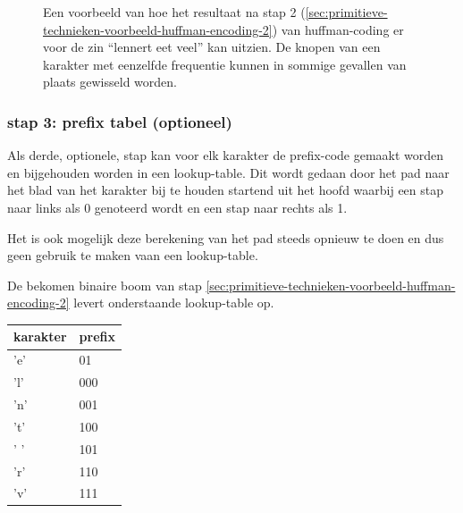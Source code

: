 \FloatBarrier
\begin{figure}[h!]
	\caption{Een voorbeeld van hoe het resultaat na stap 2 (\ref{sec:primitieve-technieken-voorbeeld-huffman-encoding-2}) van \gls{huffman-coding} er voor de zin “lennert eet veel” kan uitzien. De knopen van een karakter met eenzelfde frequentie kunnen in sommige gevallen van plaats gewisseld worden.}
	\label{fig:huffman-stap-2}
\end{figure}
\FloatBarrier

\subsubsection{stap 3: prefix tabel (optioneel)}
\label{sec:primitieve-technieken-voorbeeld-huffman-encoding-3}
Als derde, optionele, stap kan voor elk karakter de \gls{prefix-code} gemaakt worden en bijgehouden worden in een \gls{lookup-table}. Dit wordt gedaan door het pad naar het blad van het karakter bij te houden startend uit het hoofd waarbij een stap naar links als 0 genoteerd wordt en een stap naar rechts als 1.

Het is ook mogelijk deze berekening van het pad steeds opnieuw te doen en dus geen gebruik te maken vaan een \gls{lookup-table}.

De bekomen binaire boom van stap \ref{sec:primitieve-technieken-voorbeeld-huffman-encoding-2} levert onderstaande \gls{lookup-table} op.

\FloatBarrier
\begin{table}[h!]
	\begin{tabular}{|l|l|}
		\hline
		\textbf{karakter} & \textbf{prefix} \\ \hline
		'e'               & 01              \\ \hline
		'l'               & 000             \\ \hline
		'n'               & 001             \\ \hline
		't'               & 100             \\ \hline
		' '               & 101             \\ \hline
		'r'               & 110             \\ \hline
		'v'               & 111             \\ \hline  
	\end{tabular}
\end{table}
\FloatBarrier

